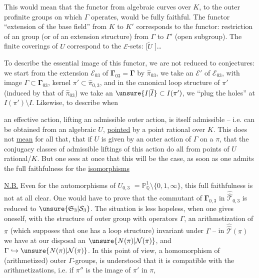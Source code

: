 This would mean that the functor from algebraic
curves over $K$, to the outer profinite groups
on which $\Gamma$ operates, would be fully faithful.
The functor ``extension of the base field'' from
$K$ to $K'$ corresponds to the functor: restriction
of an  group (or of an extension
structure) from $\Gamma$ to $\Gamma'$ (open subgroup).
The finite  coverings of $U$ correspond to the
$\mathcal E$-sets: [$\widetilde U$ ]\ldots

To describe the essential image of this
functor, we are not reduced to conjectures:
we start from the  extension $\mathcal E_{03}$ of $\boldsymbol{\Gamma}_{03}=\boldsymbol{\Gamma}$
by $\widehat{\pi}_{03}$, we take an   $\mathcal E'$
of $\mathcal E_{03}$, with image $\Gamma\subset\boldsymbol{\Gamma}_{03}$, kernel
$\pi'\subset\widehat{\pi}_{0,3}$, and in the canonical loop
structure of $\pi'$ (induced by that of $\widehat{\pi}_{03}$)
we take an $\unsure{I|\overline I}\subset I(\pi')$,  we ``plug the holes''
at $I(\pi')\setminus I$. Likewise, to describe when

an effective action, lifting an admissible outer
action, is itself admissible -- 
i.e. can be obtained from an algebraic 
$U$, \uline{pointed} by a point rational over $K$.
This does not \uline{mean} for all that, that if
$U$ is given by an outer action of $\Gamma$ on a $\pi$,
that the conjugacy classes of admissible liftings
of this action do all  from
points of $U$ rational/$K$. But one sees at once that
this will be the case, as soon as one admits the
full faithfulness for the \uline{isomorphisms}

\uline{N.B.} Even for the automorphisms of $U_{0,3}$
$=\mathbb P^1_{\mathbb Q}\setminus\{0,1,\infty\}$, this full faithfulness is not
at all clear. One would have to prove that 
the commutant of $\boldsymbol{\Gamma}_{0,3}$ in $\widehat{\widehat{\mathcal T}}_{0,3}$ is reduced
to $\unsure{\mathfrak S_3|\mathcal S_3}$. The situation is less hopeless,
when one gives oneself, with the structure of
 outer group with operators $\Gamma$, an arithmetization
of $\pi$ (which supposes that one has 
a loop structure) invariant under  $\Gamma$
--  in $\widehat{\widehat{\mathcal T}}(\pi)$ we have at our disposal an $\unsure{N(\pi)|\mathcal N(\pi)}$,
and $\Gamma\hookrightarrow\unsure{N(\pi)|\mathcal N(\pi)}$. In this point of view,  a
homomorphism  of (arithmetized) outer $\Gamma$-groups,
 is understood that it is compatible with
the arithmetizations, i.e. if $\pi''$ is the image of $\pi'$ in $\pi$,

